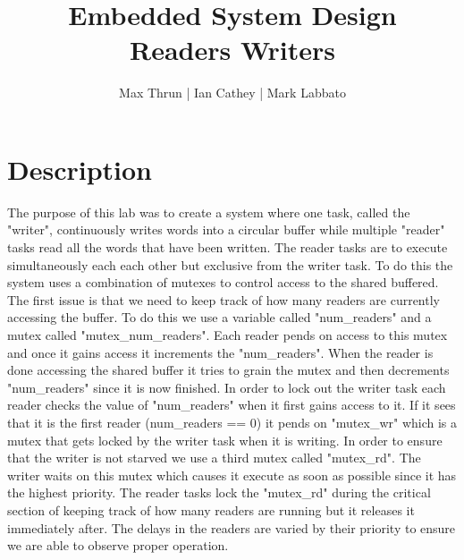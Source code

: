 \documentclass[12pt]{article}
\title{Embedded System Design \\ Readers Writers}
\author{ Max Thrun | Ian Cathey | Mark Labbato }
\begin{document}
\maketitle


\section*{Description}

The purpose of this lab was to create a system where one task, 
called the "writer", continuously writes words into a circular buffer while
multiple "reader" tasks read all the words that have been written. The
reader tasks are to execute simultaneously each each other but exclusive
from the writer task. To do this the system uses a combination of mutexes
to control access to the shared buffered. The first issue is that we need
to keep track of how many readers are currently accessing the buffer. To
do this we use a variable called "num\_readers" and a mutex called
"mutex\_num\_readers". Each reader pends on access to this mutex and once
it gains access it increments the "num\_readers". When the reader is done
accessing the shared buffer it tries to grain the mutex and then decrements
"num\_readers" since it is now finished. In order to lock out the writer
task each reader checks the value of "num\_readers" when it first gains access
to it. If it sees that it is the first reader (num\_readers == 0) it pends on
"mutex\_wr" which is a mutex that gets locked by the writer task when it is
writing. In order to ensure that the writer is not starved we use a third
mutex called "mutex\_rd". The writer waits on this mutex which causes it
execute as soon as possible since it has the highest priority. The reader
tasks lock the "mutex\_rd" during the critical section of keeping track of 
how many readers are running but it releases it immediately after. The delays
in the readers are varied by their priority to ensure we are able to observe
proper operation.
\end{document}
